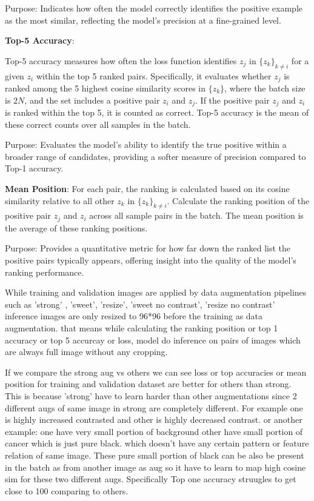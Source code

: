 Purpose: Indicates how often the model correctly identifies the positive example as the most similar, reflecting the model's precision at a fine-grained level.


\textbf{Top-5 Accuracy}:

Top-5 accuracy measures how often the loss function identifies \( z_j \) in \( \{ z_k \}_{k \neq i} \) for a given \( z_i \) within the top 5 ranked pairs. Specifically, it evaluates whether \( z_j \) is ranked among the 5 highest cosine similarity scores in \( \{ z_k \} \), where the batch size is \( 2N \), and the set includes a positive pair \( z_i \) and \( z_j \).  
If the positive pair \( z_j \) and \( z_i \) is ranked within the top 5, it is counted as correct. Top-5 accuracy is the mean of these correct counts over all samples in the batch.  

Purpose: Evaluates the model's ability to identify the true positive within a broader range of candidates, providing a softer measure of precision compared to Top-1 accuracy.

\textbf{Mean Position}: 
For each pair, the ranking is calculated based on its cosine similarity relative to all other \( z_k \) in \( \{ z_k \}_{k \neq i} \). Calculate the ranking position of the positive 
pair \( z_j \) and  \( z_i \) across all sample pairs in the batch. The mean position is the average of these ranking positions.

Purpose: Provides a quantitative metric for how far down the ranked list the  positive pairs typically appears, offering insight into the quality of the model's ranking performance.

While training  and validation images are applied by data augmentation pipelines such as 'strong' , 'sweet', 'resize', 'sweet no contrast', 'resize no contrast' inference 
images are only resized to 96*96 before the training as data augmentation. that means while calculating the ranking position or top 1 accuracy or top 5 accurcay or loss, model do inference on pairs 
of images which are always full image without any cropping.

If we compare the strong aug vs others we can see loss or top accuracies or mean position for training and validation dataset 
are better for others than strong. This is because 'strong' have to learn harder than other augmentations since 2 different 
augs of same image in strong are completely different. For example one is highly increased contrasted and other is highly 
decreased contrast. or another example: one have very small portion of background other have small portion of cancer which is
 just pure black.  which doesn't have any certain pattern or feature relation of same image. These pure small portion of black can be also be present in the batch as  from another image as aug
 so it have to learn to map high cosine sim for these two different augs. Specifically Top one accuracy struugles to get close to 100  comparing to others.

